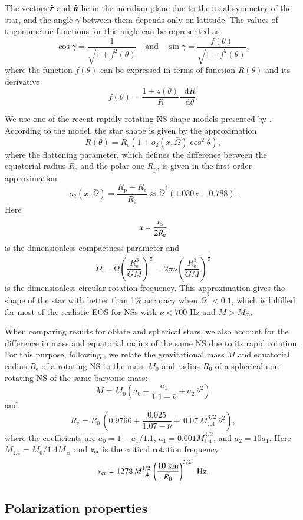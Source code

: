 \documentclass{aa}
\newcommand{\be}{\begin{equation}}
\newcommand{\ee}{\end{equation}}
\newcommand{\unit}[1]{\mbox{\boldmath $\hat{#1}$}}
\newcommand*\df {\mathop{}\!\mathrm{d}}
\newcommand{\red}[1]{\textcolor{red}{#1}}
\newcommand{\req}{R_{\mathrm{e}}}
\newcommand{\rpol}{R_{\mathrm{p}}}
\newcommand{\msun}{{M}_{\sun}}
\begin{document}
The vectors $\unit{r}$ and $\unit{n}$ lie in the meridian plane due to the axial symmetry of the star, and the angle $\gamma$ between them depends only on latitude.
The values of trigonometric functions for this angle can be represented as 
\be
\cos\gamma=\frac1{\sqrt{ 1+ f^2(\theta) }}
\quad\text{and} \quad
\sin\gamma=\frac{f(\theta)}{\sqrt{ 1+ f^2(\theta) }},
\ee
where the function $f(\theta)$ can be expressed in terms of function $R(\theta)$ and its derivative
\be\label{eq:shape}
	f(\theta)= \frac{1+z(\theta)}R\frac{\df R}{\df \theta}.
\ee

We use one of the recent rapidly rotating NS shape models presented by \citet{AGM14}.
According to the model, the star shape is given by the approximation 
\be
R(\theta)=\req\left(1+o_2(x,\bar\Omega)\cos^2\theta\right), 
\ee 
where the flattening parameter, which defines the difference between the equatorial radius $\req$ and the polar one $\rpol$,
is given in the first order approximation 
\be
o_2(x,\bar\Omega)=\frac{\rpol-\req}{\req}\approx\bar\Omega^2(1.030x-0.788). 
\ee
Here 
\be
x=\frac{r_{\rm s}}{2\req}
\ee
is the dimensionless compactness parameter and 
\be
\bar\Omega=\Omega\left(\frac{\req^3}{GM}\right)^{\frac12}=2 \pi \nu \left(\frac{\req^3}{GM}\right)^{\frac12}
\ee
is the dimensionless circular rotation frequency. 
This approximation gives the shape of the star with better than 1\% accuracy when $\bar\Omega^2<0.1$, which is fulfilled for  most of the realistic EOS for NSs with $\nu<700$ Hz and $M>M_{\odot}$. 

When comparing results for oblate and spherical stars, we also account for the difference in mass and equatorial radius of the same NS due to its rapid rotation. 
For this purpose, following \citet{SP20}, we relate the gravitational mass $M$ and equatorial radius $\req$ of a rotating NS to the mass $M_0$ and radius $R_0$ of a spherical non-rotating NS of the same baryonic mass:
\be \label{eq:massprime}
M=M_0\left(a_0  + \frac{a_1}{1.1-\bar \nu}+ a_2\,\bar \nu^2\right) 
\ee
and
\be \label{eq:RRe}
 \req =R_0\,\left(0.9766+\frac{0.025}{1.07-\bar \nu}+\,0.07\,M_{1.4}^{3/2}\,\bar \nu^2\right) ,
\ee
where the coefficients are $a_0=1-a_1/1.1$, $a_1=0.001 M_{1.4}^{3/2}$, and $a_2=10 a_1$.
Here $M_{1.4}=M_0/1.4\msun$ and  $\nu_{\rm cr}$ is the critical rotation frequency 
\be \label{eq:critical_nu}
\nu_{\rm cr} = 1278\,M_{1.4}^{1/2}\, \left(\frac{10~{\rm km}}{R_{0}}\right)^{3/2}\ \ \mathrm{Hz}.
\ee

\subsection{Polarization properties} 
\end{document}
